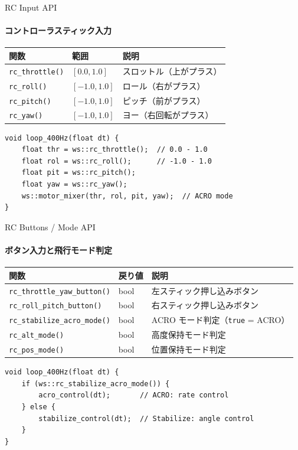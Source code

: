 \documentclass[aspectratio=169, 14pt]{beamer}
\begin{document}
\begin{frame}[fragile]{RC Input API}
  \framesubtitle{コントローラスティック入力}
  {\small
  \begin{tabular}{lll}
    \hline
    \textbf{関数} & \textbf{範囲} & \textbf{説明} \\
    \hline
    \texttt{rc\_throttle()} & $[0.0, 1.0]$   & スロットル（上がプラス） \\
    \texttt{rc\_roll()}     & $[-1.0, 1.0]$  & ロール（右がプラス） \\
    \texttt{rc\_pitch()}    & $[-1.0, 1.0]$  & ピッチ（前がプラス） \\
    \texttt{rc\_yaw()}      & $[-1.0, 1.0]$  & ヨー（右回転がプラス） \\
    \hline
  \end{tabular}
  }

  \vspace{0.3em}

  \begin{lstlisting}[style=sfcpp, basicstyle=\ttfamily\scriptsize]
void loop_400Hz(float dt) {
    float thr = ws::rc_throttle();  // 0.0 - 1.0
    float rol = ws::rc_roll();      // -1.0 - 1.0
    float pit = ws::rc_pitch();
    float yaw = ws::rc_yaw();
    ws::motor_mixer(thr, rol, pit, yaw);  // ACRO mode
}
  \end{lstlisting}
\end{frame}

\begin{frame}[fragile]{RC Buttons / Mode API}
  \framesubtitle{ボタン入力と飛行モード判定}
  {\small
  \begin{tabular}{lll}
    \hline
    \textbf{関数} & \textbf{戻り値} & \textbf{説明} \\
    \hline
    \texttt{rc\_throttle\_yaw\_button()}  & bool & 左スティック押し込みボタン \\
    \texttt{rc\_roll\_pitch\_button()}    & bool & 右スティック押し込みボタン \\
    \texttt{rc\_stabilize\_acro\_mode()}  & bool & ACRO モード判定（\texttt{true} = ACRO） \\
    \texttt{rc\_alt\_mode()}             & bool & 高度保持モード判定 \\
    \texttt{rc\_pos\_mode()}             & bool & 位置保持モード判定 \\
    \hline
  \end{tabular}
  }

  \vspace{0.3em}

  \begin{lstlisting}[style=sfcpp, basicstyle=\ttfamily\scriptsize]
void loop_400Hz(float dt) {
    if (ws::rc_stabilize_acro_mode()) {
        acro_control(dt);       // ACRO: rate control
    } else {
        stabilize_control(dt);  // Stabilize: angle control
    }
}
  \end{lstlisting}
\end{frame}
\end{document}
